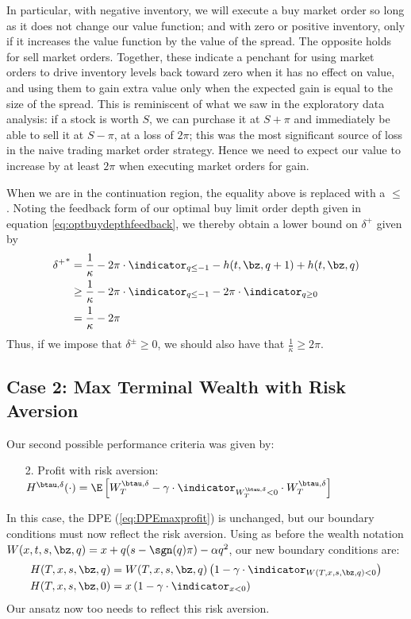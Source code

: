\documentclass[12pt]{article}
\begin{document}
In particular, with negative inventory, we will execute a buy market order so long as it does not change our value function; and with zero or positive inventory, only if it increases the value function by the value of the spread. The opposite holds for sell market orders. Together, these indicate a penchant for using market orders to drive inventory levels back toward zero when it has no effect on value, and using them to gain extra value only when the expected gain is equal to the size of the spread. This is reminiscent of what we saw in the exploratory data analysis: if a stock is worth $S$, we can purchase it at $S+\pi$ and immediately be able to sell it at $S-\pi$, at a loss of $2 \pi$; this was the most significant source of loss in the naive trading market order strategy. Hence we need to expect our value to increase by at least $2\pi$ when executing market orders for gain.

When we are in the continuation region, the equality above is replaced with a $\leq$. Noting the feedback form of our optimal buy limit order depth given in equation \ref{eq:optbuydepthfeedback}, we thereby obtain a lower bound on $\delta^+$ given by
\begin{align*}
{\delta^+}^* & = \frac{1}{\kappa} - 2 \pi \cdot \indicator_{q \leq -1} - h(t,\bz,q+1) + h(t,\bz,q) \\
& \geq \frac{1}{\kappa} - 2 \pi \cdot \indicator_{q \leq -1} - 2 \pi \cdot \indicator_{q \geq 0} \\
& = \frac{1}{\kappa} - 2 \pi
\end{align*}
Thus, if we impose that $\delta^\pm \geq 0$, we should also have that $\frac{1}{\kappa} \geq 2 \pi$.

\subsection*{Case 2: Max Terminal Wealth with Risk Aversion}
Our second possible performance criteria was given by:
\begin{enumerate}[noitemsep, topsep=0pt]
\item[2.] Profit with risk aversion: $H^{\btau, \delta}(\cdot) = \E \left[  W_T^{\btau, \delta} - \gamma \cdot \indicator_{W_T^{\btau, \delta}<0} \cdot W_T^{\btau, \delta} \right]$
\end{enumerate}
In this case, the DPE (\ref{eq:DPEmaxprofit}) is unchanged, but our boundary conditions must now reflect the risk aversion. Using as before the wealth notation $W(x,t,s,\bz,q) = x + q( s - \sgn(q)\pi) - \alpha q^2$, our new boundary conditions are:
\begin{align}
H(T, x, s, \bz, q) & = W(T, x, s, \bz, q) \left( 1 - \gamma \cdot \indicator_{W(T, x, s, \bz, q) < 0} \right) \\
H(T, x, s, \bz, 0) & = x\left( 1 - \gamma \cdot \indicator_{x < 0} \right) 
\end{align}
Our ansatz now too needs to reflect this risk aversion. 
\end{document}
